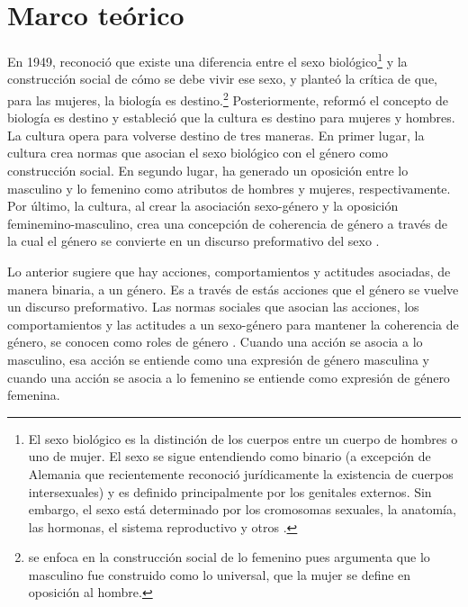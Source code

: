 \section{Marco teórico}
En 1949, \citeauthor{beauviour1949segundosexo} reconoció que existe una diferencia entre el sexo biológico\footnote{El sexo biológico es la distinción de los cuerpos entre un cuerpo de hombres o uno de mujer. El sexo se sigue entendiendo como binario (a excepción de Alemania que recientemente reconoció jurídicamente la existencia de cuerpos intersexuales) y es definido principalmente por los genitales externos. Sin embargo, el sexo está determinado por los cromosomas sexuales, la anatomía, las hormonas, el sistema reproductivo y otros \citep{lindsey2015genderroles}.} y la construcción social de cómo se debe vivir ese sexo, y planteó la crítica de que, para las mujeres, la biología es destino.\footnote{\cite{beauviour1949segundosexo} se enfoca en la construcción social de lo femenino pues argumenta que lo masculino fue construido como lo universal, que la mujer se define en oposición al hombre.} Posteriormente, \cite{butler2002gendertrouble} reformó el concepto de biología es destino y estableció que la cultura es destino para mujeres y hombres. La cultura opera para volverse destino de tres maneras. En primer lugar, la cultura crea normas que asocian el sexo biológico con el género como construcción social. En segundo lugar, ha generado un oposición entre lo masculino y lo femenino como atributos de hombres y mujeres, respectivamente. Por último, la cultura, al crear la asociación sexo-género y la oposición feminemino-masculino, crea una concepción de coherencia de género a través de la cual el género se convierte en un discurso preformativo del sexo \citep{butler2002gendertrouble}.

Lo anterior sugiere que hay acciones, comportamientos y actitudes asociadas, de manera binaria, a un género. Es a través de estás acciones que el género se vuelve un discurso preformativo. Las normas sociales que asocian las acciones, los comportamientos y las actitudes a un sexo-género para mantener la coherencia de género, se conocen como roles de género \citep{lindsey2015genderroles}. Cuando una acción se asocia a lo masculino, esa acción se entiende como una expresión de género masculina y cuando una acción se asocia a lo femenino se entiende como expresión de género femenina.

